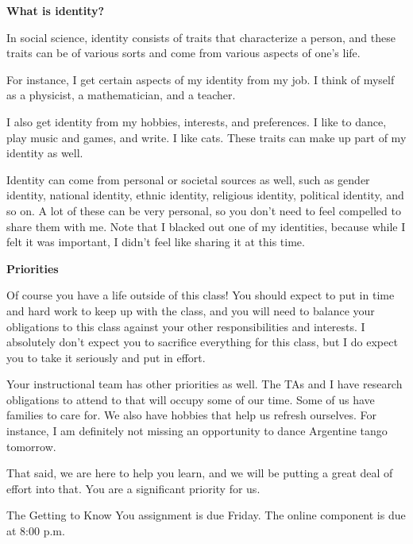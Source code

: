 \documentclass[]{article}
\begin{document}
\begin{TeacherMargin}
\noindent\textbf{What is identity?}

In social science, identity consists of traits that characterize a person, and these traits can be of various sorts and come from various aspects of one's life.

For instance, I get certain aspects of my identity from my job. I think of myself as a physicist, a mathematician, and a teacher.

I also get identity from my hobbies, interests, and preferences. I like to dance, play music and games, and write. I like cats. These traits can make up part of my identity as well.

Identity can come from personal or societal sources as well, such as gender identity, national identity, ethnic identity, religious identity, political identity, and so on. A lot of these can be very personal, so you don't need to feel compelled to share them with me. Note that I blacked out one of my identities, because while I felt it was important, I didn't feel like sharing it at this time.

\noindent\textbf{Priorities}

Of course you have a life outside of this class! You should expect to put in time and hard work to keep up with the class, and you will need to balance your obligations to this class against your other responsibilities and interests. I absolutely don't expect you to sacrifice everything for this class, but I do expect you to take it seriously and put in effort.

Your instructional team has other priorities as well. The TAs and I have research obligations to attend to that will occupy some of our time. Some of us have families to care for. We also have hobbies that help us refresh ourselves. For instance, I am definitely not missing an opportunity to dance Argentine tango tomorrow.

That said, we are here to help you learn, and we will be putting a great deal of effort into that. You are a significant priority for us.

\begin{center}
	\Large The Getting to Know You assignment is due Friday. The online component is due at 8:00 p.m.
\end{center}
\end{TeacherMargin}
\end{document}
